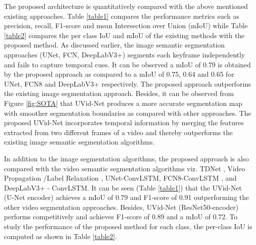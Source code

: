 \documentclass[journal]{IEEEtran}
\begin{document}
The proposed architecture is quantitatively compared with the above mentioned existing approaches. Table \ref{table1} compares the performance metrics such as precision, recall, F1-score and mean Intersection over Union (mIoU) while Table \ref{table2} compares the per class IoU and mIoU of the existing methods with the proposed method. As discussed earlier, the image semantic segmentation approaches (UNet, FCN, DeepLabV3+) segments each keyframe independently and fails to capture temporal cues. It can be observed a mIoU of 0.79 is obtained by the proposed approach as compared to a mIoU of 0.75, 0.64 and 0.65 for UNet, FCN8 and DeepLabV3+ respectively. The proposed approach outperforms the existing image segmentation approach. Besides, it can be observed from Figure \ref{fig:SOTA} that UVid-Net produces a more accurate segmentation map with smoother segmentation boundaries as compared with other approaches. The proposed UVid-Net incorporates temporal information by merging the features extracted from two different frames of a video and thereby outperforms the existing image semantic segmentation algorithms.

In addition to the image segmentation algorithms, the proposed approach is also compared with the video semantic segmentation algorithms viz. TDNet \cite{hu2020temporally}, Video Propagation /Label Relaxation \cite{22}, UNet-ConvLSTM, FCN8-ConvLSTM \cite{wang2019deep}, and DeepLabV3+ - ConvLSTM. It can be seen (Table \ref{table1})  that the UVid-Net (U-Net encoder) achieves a mIoU of 0.79 and F1-score of 0.91  outperforming the other video segmentation approaches. Besides, UVid-Net (ResNet50-encoder) performs competitively and achieves F1-score of 0.89 and a mIoU of 0.72. To study the performance of the proposed method for each class, the per-class IoU is computed as shown in Table \ref{table2}. 
\end{document}
